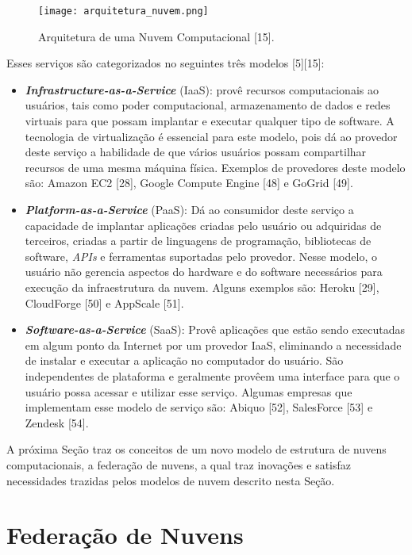 \begin{figure}[H]
	\centering
	\texttt{[image: arquitetura\_nuvem.png]}
	\caption{Arquitetura de uma Nuvem Computacional [15].}
	\label{fig:cloud_architecture}
\end{figure}

Esses serviços são categorizados no seguintes três modelos \cite{cloud_360}[5][15]: 

\begin{itemize}
	\item \textbf{\textit{Infrastructure-as-a-Service}} (IaaS): provê recursos computacionais ao usuários, tais como poder computacional, armazenamento de dados e redes virtuais para que possam implantar e executar qualquer tipo de software. A tecnologia de virtualização é essencial para este modelo, pois dá ao provedor deste serviço a habilidade de que vários usuários possam compartilhar recursos de uma mesma máquina física. Exemplos de provedores deste modelo são: Amazon EC2 [28], Google Compute Engine [48] e GoGrid [49].
	\item \textit{\textbf{Platform-as-a-Service}} (PaaS): Dá ao consumidor deste serviço a capacidade de implantar aplicações criadas pelo usuário ou adquiridas de terceiros, criadas a partir de linguagens de programação, bibliotecas de software, \textit{APIs} e ferramentas suportadas pelo provedor. Nesse modelo, o usuário não gerencia aspectos do hardware e do software necessários para execução da infraestrutura da nuvem. Alguns exemplos são: Heroku [29], CloudForge [50] e AppScale [51].
	\item \textit{\textbf{Software-as-a-Service}} (SaaS): 	Provê aplicações que estão sendo executadas em algum ponto da Internet por um provedor IaaS, eliminando a necessidade de instalar e executar a aplicação no computador do usuário. São independentes de plataforma e geralmente provêem uma interface para que o usuário possa acessar e utilizar esse serviço. Algumas empresas que implementam esse modelo de serviço são: Abiquo [52], SalesForce [53] e Zendesk [54]. 
\end{itemize}

A próxima Seção traz os conceitos de um novo modelo de estrutura de nuvens computacionais, a federação de nuvens, a qual traz inovações e satisfaz necessidades trazidas pelos modelos de nuvem descrito nesta Seção.

\section{Federação de Nuvens} \label{cap2sec3}

